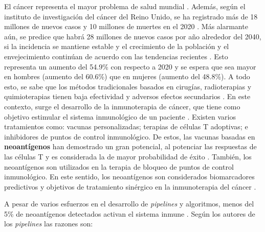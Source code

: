 \documentclass[a4paper,11pt]{article}
\begin{document}
El cáncer representa el mayor problema de salud mundial \cite{siegel2023cancer}. Además, según el instituto de investigación del cáncer del Reino Unido, se ha registrado más de 18 millones de nuevos casos y 10 millones de muertes en el 2020 \cite{cancerUK2023}. Más alarmante aún, se predice que habrá 28 millones de nuevos casos por año alrededor del 2040, si la incidencia se mantiene estable y el crecimiento de la población y el envejecimiento continúan de acuerdo con las tendencias recientes \cite{cancerUK2023_2}. Esto representa un aumento del 54.9\% con respecto a 2020 y se espera que sea mayor en hombres (aumento del 60.6\%) que en mujeres (aumento del 48.8\%).	A todo esto, se sabe que los métodos tradicionales basados en cirugías, radioterapias y quimioterapias tienen baja efectividad y adversos efectos secundarios \cite{peng2019neoantigen}. En este contexto, surge el desarrollo de la inmunoterapia de cáncer, que tiene como objetivo estimular el sistema inmunológico de un paciente \cite{borden2022cancer}. Existen varios tratamientos como: vacunas personalizadas; terapias de células T adoptivas; e inhibidores de puntos de control inmunológico. De estos, las vacunas basadas en \textbf{neoantígenos} han demostrado un gran potencial, al potenciar las respuestas de las células T y es considerada la de mayor probabilidad de éxito \cite{borden2022cancer}. También, los neoantígenos son utilizados en la terapia de bloqueo de puntos de control inmunológico. En este sentido, los neoantígenos son considerados biomarcadores predictivos y objetivos de tratamiento sinérgico en la inmunoterapia del cáncer \cite{fang2022neoantigens}.

A pesar de varios esfuerzos en el desarrollo de \textit{pipelines} y algoritmos, menos del 5\% de neoantígenos detectados activan el sistema inmune \cite{de2020neoantigen, mill2022neoms, bulik2019deep, bassani2015mass, yadav2014predicting}. Según los autores de los \textit{pipelines} las razones son: 
\end{document}
